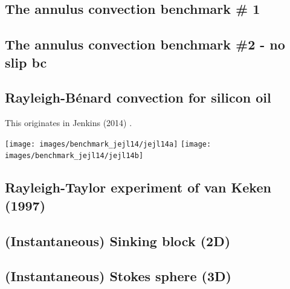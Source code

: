 \newpage
\subsection{The annulus convection benchmark \# 1} \label{ss:anconv}


\newpage
\subsection{The annulus convection benchmark \#2 - no slip bc} \label{ss:anconv2}


\subsection{Rayleigh-B{\'e}nard convection for silicon oil}

This originates in Jenkins \etal (2014) \cite{jejl14}.

\begin{center}
\texttt{[image: images/benchmark\_jejl14/jejl14a]}
\texttt{[image: images/benchmark\_jejl14/jejl14b]}
\end{center}

\newpage
\subsection{Rayleigh-Taylor experiment of van Keken \etal (1997)} \label{ss:vaks97}


\newpage
\subsection{(Instantaneous) Sinking block (2D)} \label{ss:sinking_block}


\newpage
\subsection{(Instantaneous) Stokes sphere (3D)} \label{ss:stokes_sphere3D}


